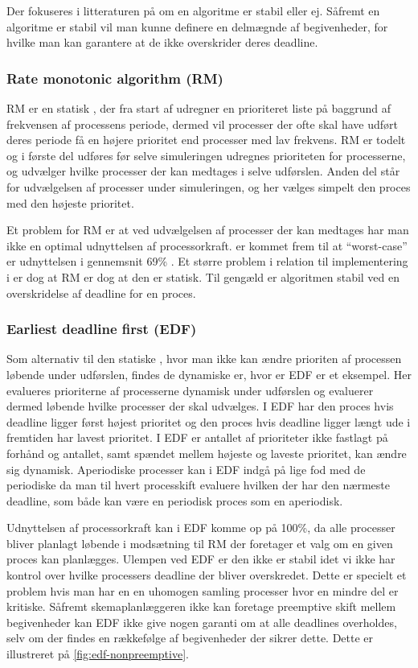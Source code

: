 Der fokuseres i litteraturen på om en algoritme er stabil eller ej. Såfremt en algoritme er stabil vil man kunne definere en delmægnde af begivenheder, for hvilke man kan garantere at de ikke overskrider deres deadline. 

\subsubsection{Rate monotonic algorithm (RM)}
RM er en statisk \sched, der fra start af udregner en prioriteret liste på baggrund af frekvensen af processens periode, dermed vil processer der ofte skal have udført deres periode få en højere prioritet end processer med lav frekvens. RM er todelt og i første del udføres før selve simuleringen udregnes  prioriteten for processerne, og udvælger hvilke processer der kan medtages i selve udførslen. Anden del står for udvælgelsen af processer  under simuleringen, og her vælges simpelt den proces med den højeste prioritet. 

Et problem for RM er at ved udvælgelsen af processer der kan medtages har man ikke en optimal udnyttelsen af processorkraft.  er kommet frem til at ``worst-case'' er udnyttelsen i gennemsnit 69\% \cite{lehoczky1989rate}. Et større problem i relation til implementering i \pycsp er dog at RM er dog at den er statisk. Til gengæld er algoritmen stabil ved en overskridelse af deadline for en proces. 

\subsubsection{Earliest deadline first (EDF)}
\label{sec:edf}
Som alternativ til den statiske \sched, hvor man ikke kan ændre prioriten af processen løbende under udførslen, findes de dynamiske \sched er, hvor er EDF er et eksempel. Her evalueres prioriterne af processerne dynamisk under udførslen og evaluerer dermed løbende hvilke processer der skal udvælges. I EDF har den proces hvis deadline ligger først højest prioritet og den proces hvis deadline ligger længt ude i fremtiden har lavest prioritet. I EDF er antallet af prioriteter ikke fastlagt på forhånd og antallet, samt spændet mellem højeste og laveste prioritet, kan ændre sig dynamisk. Aperiodiske processer kan i EDF indgå på lige fod med de periodiske da man til hvert processkift evaluere hvilken der har den nærmeste deadline, som både kan være en periodisk proces som en aperiodisk.

Udnyttelsen af processorkraft kan i EDF komme op på 100\%, da alle processer bliver planlagt løbende i modsætning til RM der foretager et valg om en given proces kan planlægges.  Ulempen ved EDF er den ikke er stabil idet vi ikke har kontrol over hvilke processers deadline der bliver overskredet. Dette er specielt et problem hvis man har en en uhomogen samling processer hvor en mindre del er kritiske. Såfremt skemaplanlæggeren ikke kan foretage preemptive skift mellem begivenheder kan EDF ikke give nogen garanti om at alle deadlines overholdes, selv om der findes en rækkefølge af begivenheder der sikrer dette. Dette er illustreret på \cref{fig:edf-nonpreemptive}.

